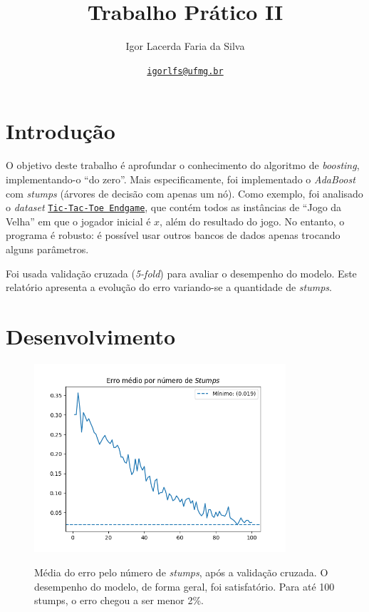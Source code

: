 \documentclass[a4paper]{article}
\title{Trabalho Prático II}
\author{Igor Lacerda Faria da Silva}
\date{\href{mailto:igorlfs@ufmg.br}{\texttt{igorlfs@ufmg.br}} }
\begin{document}
\pagestyle{fancy}

\maketitle

\section*{Introdução}
\label{sec:Introdução}

O objetivo deste trabalho é aprofundar o conhecimento do algoritmo de \textit{boosting}, implementando-o “do zero”. Mais especificamente, foi implementado o \textit{AdaBoost} com \textit{stumps} (árvores de decisão com apenas um nó). Como exemplo, foi analisado o \textit{dataset} \href{https://archive.ics.uci.edu/dataset/101/tic+tac+toe+endgame}{\texttt{Tic-Tac-Toe Endgame}}, que contém todos as instâncias de “Jogo da Velha” em que o jogador inicial é $x$, além do resultado do jogo. No entanto, o programa é robusto: é possível usar outros bancos de dados apenas trocando alguns parâmetros.

Foi usada validação cruzada (\textit{5-fold}) para avaliar o desempenho do modelo. Este relatório apresenta a evolução do erro variando-se a quantidade de \textit{stumps}.

\section*{Desenvolvimento}%
\label{sec:Desenvolvimento}

\begin{figure}[H]
	\begin{center}
		{\includegraphics[height=7cm]{./images/error_per_stumps.png}}
	\end{center}
	\caption{Média do erro pelo número de \textit{stumps}, após a validação cruzada. O desempenho do modelo, de forma geral, foi satisfatório. Para até 100 stumps, o erro chegou a ser menor 2\%. \label{fig:unique}}
\end{figure}
\end{document}
